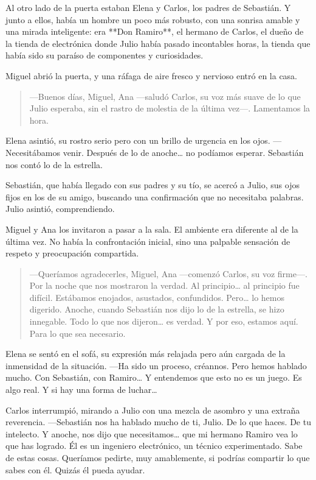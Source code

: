 \documentclass[a4paper,12pt]{book}
\begin{document}
Al otro lado de la puerta estaban Elena y Carlos, los padres de Sebastián. Y junto a ellos, había un hombre un poco más robusto, con una sonrisa amable y una mirada inteligente: era **Don Ramiro**, el hermano de Carlos, el dueño de la tienda de electrónica donde Julio había pasado incontables horas, la tienda que había sido su paraíso de componentes y curiosidades.

Miguel abrió la puerta, y una ráfaga de aire fresco y nervioso entró en la casa.

\begin{quote}
    —Buenos días, Miguel, Ana —saludó Carlos, su voz más suave de lo que Julio esperaba, sin el rastro de molestia de la última vez—. Lamentamos la hora.
\end{quote}

Elena asintió, su rostro serio pero con un brillo de urgencia en los ojos. —Necesitábamos venir. Después de lo de anoche… no podíamos esperar. Sebastián nos contó lo de la estrella.

Sebastián, que había llegado con sus padres y su tío, se acercó a Julio, sus ojos fijos en los de su amigo, buscando una confirmación que no necesitaba palabras. Julio asintió, comprendiendo.

Miguel y Ana los invitaron a pasar a la sala. El ambiente era diferente al de la última vez. No había la confrontación inicial, sino una palpable sensación de respeto y preocupación compartida.

\begin{quote}
    —Queríamos agradecerles, Miguel, Ana —comenzó Carlos, su voz firme—. Por la noche que nos mostraron la verdad. Al principio… al principio fue difícil. Estábamos enojados, asustados, confundidos. Pero… lo hemos digerido. Anoche, cuando Sebastián nos dijo lo de la estrella, se hizo innegable. Todo lo que nos dijeron… es verdad. Y por eso, estamos aquí. Para lo que sea necesario.
\end{quote}

Elena se sentó en el sofá, su expresión más relajada pero aún cargada de la inmensidad de la situación. —Ha sido un proceso, créannos. Pero hemos hablado mucho. Con Sebastián, con Ramiro… Y entendemos que esto no es un juego. Es algo real. Y si hay una forma de luchar…

Carlos interrumpió, mirando a Julio con una mezcla de asombro y una extraña reverencia. —Sebastián nos ha hablado mucho de ti, Julio. De lo que haces. De tu intelecto. Y anoche, nos dijo que necesitamos… que mi hermano Ramiro vea lo que has logrado. Él es un ingeniero electrónico, un técnico experimentado. Sabe de estas cosas. Queríamos pedirte, muy amablemente, si podrías compartir lo que sabes con él. Quizás él pueda ayudar.
\end{document}
